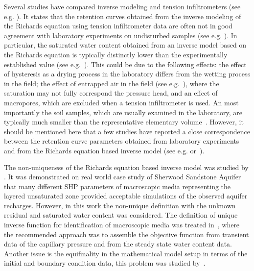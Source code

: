 \documentclass[review]{myarticle}
\begin{document}
 Several studies have compared inverse modeling and tension infiltrometers (see e.g. \citep{Verbist, Simunek1, Ventrella, Schwartz, Ramos, Simunek2}). It states that the retention curves obtained from the inverse modeling of the Richards equation using tension infiltrometer data are often not in good agreement with laboratory experiments on undisturbed samples (see e.g. \citep{rezaei}). In particular, the saturated water content obtained from an inverse model based on  the Richards equation is typically distinctly lower than the experimentally established value (see e.g.~\citep{Simunek1, Verbist}). This could be due to the following effects: the effect of hysteresis as a drying process in the laboratory differs from the wetting process in the field; the effect of entrapped air in the field (see e.g.~\citep{Fodor}), where the saturation may not fully correspond the pressure head, and an effect of macropores, which are excluded when a tension infiltrometer is used. An most importantly the soil samples, which are usually  examined in the laboratory, are typically much smaller than the representative elementary volume~\citep{scharnagl}.
 However, it should be mentioned here that a few studies have reported a close correspondence between the retention curve parameters obtained from laboratory experiments and from the Richards equation based inverse model (see e.g.\citep{Ramos} or~\citep{Schwartz}).

The non-uniqueness of the Richards equation based inverse model was studied by \citep{beven2003-uncertain}. It was demonstrated on real world case study of Sherwood Sandstone Aquifer that many different SHP parameters of macroscopic media representing the layered  unsaturated zone provided acceptable simulations of the observed aquifer recharges. However, in this work 
the non-unique definition with the unknown residual and saturated water content was considered.
The definition of unique inverse function for identification of macroscopic media was treated in~\citep{zou200126}, where the recommended approach was to assemble the objective function from transient data of the capillary pressure and from the steady state water content data. Another issue is the equifinality in the mathematical model setup in terms of the initial and boundary condition data, this problem was studied by~\citep{klaus-hydrol}.
\end{document}
